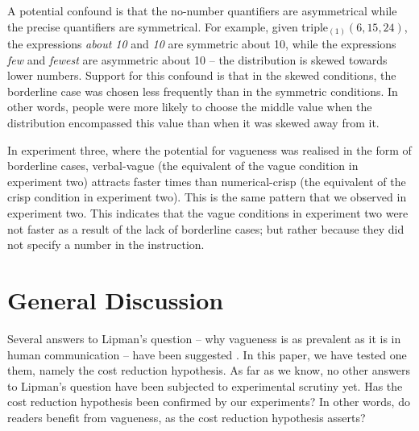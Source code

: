\documentclass[man,floatmark]{apa}
\begin{document}
A potential confound is that the no-number quantifiers are asymmetrical while the precise quantifiers are symmetrical. For example, given triple$_{(1)}(6,15,24)$, the expressions \emph{about 10} and \emph{10} are symmetric about 10, while the expressions \emph{few} and \emph{fewest} are asymmetric about 10 -- the distribution is skewed towards lower numbers. Support for this confound is that in the skewed conditions, the borderline case was chosen less frequently than in the symmetric conditions. In other words, people were more likely to choose the middle value when the distribution encompassed this value than when it was skewed away from it. 

In experiment three, where the potential for vagueness was realised in the form of borderline cases, verbal-vague (the equivalent of the vague condition in experiment two) attracts faster times than numerical-crisp (the equivalent of the crisp condition in experiment two). This is the same pattern that we observed in experiment two. This indicates that the vague conditions in experiment two were not faster as a result of the lack of borderline cases; but rather because they did not specify a number in the instruction.

\section{General Discussion}

Several answers to Lipman's question -- why vagueness is as prevalent as it is in human communication -- have been suggested \cite{van2009utility,van2010vagueness}. In this paper, we have tested one them, namely the cost reduction hypothesis. As far as we know, no other answers to Lipman's question have been subjected to experimental scrutiny yet. Has the cost reduction hypothesis been confirmed by our experiments? In other words, do readers benefit from vagueness, as the cost reduction hypothesis asserts?
\end{document}
